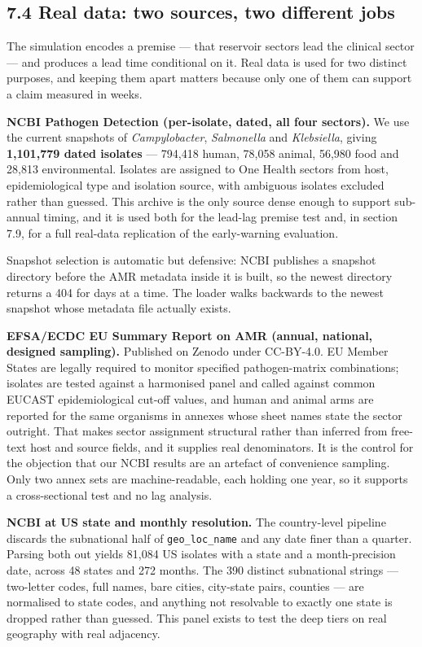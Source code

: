 \documentclass[11pt,a4paper]{article}
\begin{document}
\subsection*{7.4 Real data: two sources, two different jobs}

The simulation encodes a premise — that reservoir sectors lead the clinical sector — and produces a lead time conditional on it. Real data is used for two distinct purposes, and keeping them apart matters because only one of them can support a claim measured in weeks.

\textbf{NCBI Pathogen Detection (per-isolate, dated, all four sectors).} We use the current snapshots of \emph{Campylobacter}, \emph{Salmonella} and \emph{Klebsiella}, giving \textbf{1,101,779 dated isolates} — 794,418 human, 78,058 animal, 56,980 food and 28,813 environmental. Isolates are assigned to One Health sectors from host, epidemiological type and isolation source, with ambiguous isolates excluded rather than guessed. This archive is the only source dense enough to support sub-annual timing, and it is used both for the lead-lag premise test and, in section 7.9, for a full real-data replication of the early-warning evaluation.

Snapshot selection is automatic but defensive: NCBI publishes a snapshot directory before the AMR metadata inside it is built, so the newest directory returns a 404 for days at a time. The loader walks backwards to the newest snapshot whose metadata file actually exists.

\textbf{EFSA/ECDC EU Summary Report on AMR (annual, national, designed sampling).} Published on Zenodo under CC-BY-4.0. EU Member States are legally required to monitor specified pathogen-matrix combinations; isolates are tested against a harmonised panel and called against common EUCAST epidemiological cut-off values, and human and animal arms are reported for the same organisms in annexes whose sheet names state the sector outright. That makes sector assignment structural rather than inferred from free-text host and source fields, and it supplies real denominators. It is the control for the objection that our NCBI results are an artefact of convenience sampling. Only two annex sets are machine-readable, each holding one year, so it supports a cross-sectional test and no lag analysis.

\textbf{NCBI at US state and monthly resolution.} The country-level pipeline discards the subnational half of \texttt{geo\_loc\_name} and any date finer than a quarter. Parsing both out yields 81,084 US isolates with a state and a month-precision date, across 48 states and 272 months. The 390 distinct subnational strings — two-letter codes, full names, bare cities, city-state pairs, counties — are normalised to state codes, and anything not resolvable to exactly one state is dropped rather than guessed. This panel exists to test the deep tiers on real geography with real adjacency.
\end{document}
